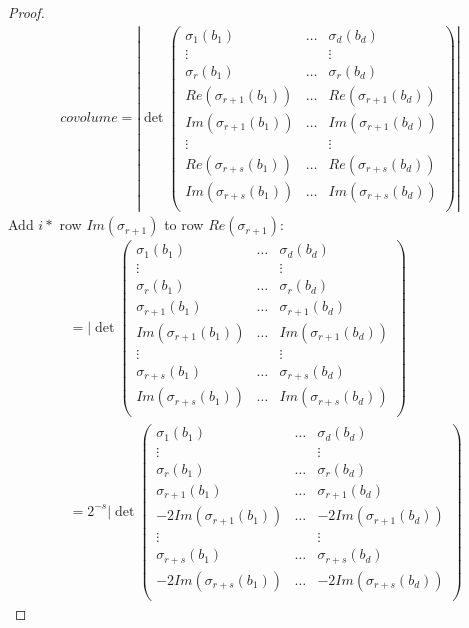 \documentclass[11pt]{article}
\begin{document}
\begin{proof}
	\begin{align*}
		covolume = |\det \begin{pmatrix}
			\sigma_1(b_1) & \dots & \sigma_d(b_d)\\
			\vdots && \vdots\\
			\sigma_r(b_1) &\dots & \sigma_r(b_d)\\
			Re (\sigma_{r+1}(b_1)) &\dots& Re(\sigma_{r+1}(b_d))\\
			Im(\sigma_{r+1}(b_1)) &\dots& Im(\sigma_{r+1}(b_d))\\
			\vdots && \vdots \\
			Re (\sigma_{r+s}(b_1)) &\dots& Re(\sigma_{r+s}(b_d))\\
			Im(\sigma_{r+s}(b_1)) &\dots& Im(\sigma_{r+s}(b_d))\\
		\end{pmatrix}
		|
	\end{align*}
	Add $i *$ row $Im (\sigma_{r+1})$ to row $Re(\sigma_{r+1})$:
	\begin{align*}&= |\det \begin{pmatrix}
			\sigma_1(b_1) & \dots & \sigma_d(b_d)\\
			\vdots && \vdots\\
			\sigma_r(b_1) &\dots & \sigma_r(b_d)\\
			\sigma_{r+1}(b_1) &\dots& \sigma_{r+1}(b_d)\\
			Im(\sigma_{r+1}(b_1)) &\dots& Im(\sigma_{r+1}(b_d))\\
			\vdots && \vdots \\
			\sigma_{r+s}(b_1) &\dots& \sigma_{r+s}(b_d)\\
			Im(\sigma_{r+s}(b_1)) &\dots& Im(\sigma_{r+s}(b_d))\\
	\end{pmatrix}\\[2em]
		& = 2^{-s} |\det
 \begin{pmatrix}
			\sigma_1(b_1) & \dots & \sigma_d(b_d)\\
			\vdots && \vdots\\
			\sigma_r(b_1) &\dots & \sigma_r(b_d)\\
			\sigma_{r+1}(b_1) &\dots& \sigma_{r+1}(b_d)\\
			-2Im(\sigma_{r+1}(b_1)) &\dots& -2Im(\sigma_{r+1}(b_d))\\
			\vdots && \vdots \\
			\sigma_{r+s}(b_1) &\dots& \sigma_{r+s}(b_d)\\
			-2Im(\sigma_{r+s}(b_1)) &\dots& -2Im(\sigma_{r+s}(b_d))\\

\end{pmatrix}
\end{align*}
\end{proof}
\end{document}
